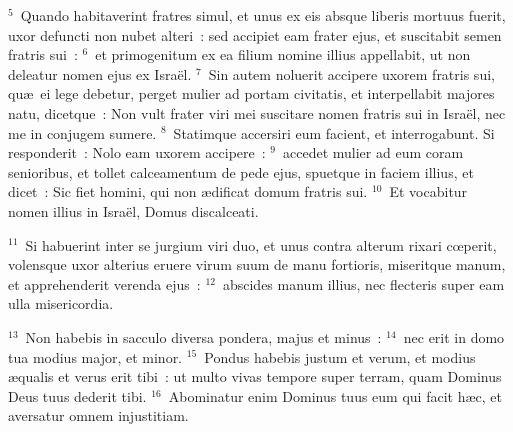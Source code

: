 ${}^{5}$~Quando habitaverint fratres simul, et unus ex eis absque liberis mortuus fuerit, uxor defuncti non nubet alteri~: sed accipiet eam frater ejus, et suscitabit semen fratris sui~:
${}^{6}$~et primogenitum ex ea filium nomine illius appellabit, ut non deleatur nomen ejus ex Isra\"el.
${}^{7}$~Sin autem noluerit accipere uxorem fratris sui, qu\ae\ ei lege debetur, perget mulier ad portam civitatis, et interpellabit majores natu, dicetque~: Non vult frater viri mei suscitare nomen fratris sui in Isra\"el, nec me in conjugem sumere.
${}^{8}$~Statimque accersiri eum facient, et interrogabunt. Si responderit~: Nolo eam uxorem accipere~:
${}^{9}$~accedet mulier ad eum coram senioribus, et tollet calceamentum de pede ejus, spuetque in faciem illius, et dicet~: Sic fiet homini, qui non \ae dificat domum fratris sui.
${}^{10}$~Et vocabitur nomen illius in Isra\"el, Domus discalceati.


${}^{11}$~Si habuerint inter se jurgium viri duo, et unus contra alterum rixari cœperit, volensque uxor alterius eruere virum suum de manu fortioris, miseritque manum, et apprehenderit verenda ejus~:
${}^{12}$~abscides manum illius, nec flecteris super eam ulla misericordia.


${}^{13}$~Non habebis in sacculo diversa pondera, majus et minus~:
${}^{14}$~nec erit in domo tua modius major, et minor.
${}^{15}$~Pondus habebis justum et verum, et modius \ae qualis et verus erit tibi~: ut multo vivas tempore super terram, quam Dominus Deus tuus dederit tibi.
${}^{16}$~Abominatur enim Dominus tuus eum qui facit h\ae c, et aversatur omnem injustitiam.


